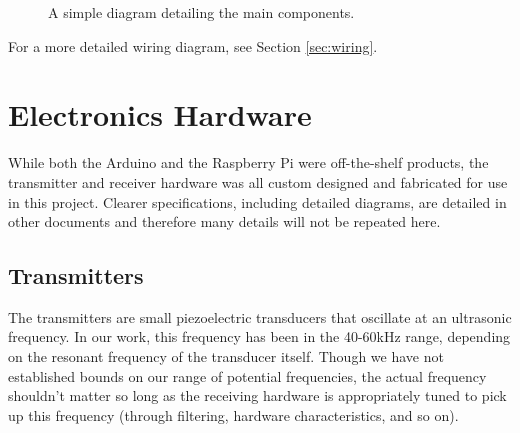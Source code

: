 \documentclass[12pt]{article}
\begin{document}
\begin{figure}[h]
\begin{center}
\end{center}
\caption{A simple diagram detailing the main components.}
\label{fig:component-diagram}
\end{figure}

For a more detailed wiring diagram, see Section \ref{sec:wiring}.

\section{Electronics Hardware}\label{sec:ee-hardware}

While both the Arduino and the Raspberry Pi were off-the-shelf products,
the transmitter and receiver hardware was all custom designed and fabricated
for use in this project.
Clearer specifications, including detailed diagrams, are detailed in other
documents and therefore many details will not be repeated here.

\subsection{Transmitters}

The transmitters are small piezoelectric transducers that oscillate at an
ultrasonic frequency.
In our work, this frequency has been in the 40-60kHz range, depending on the
resonant frequency of the transducer itself.
Though we have not established bounds on our range of potential frequencies,
the actual frequency shouldn't matter so long as the receiving hardware is
appropriately tuned to pick up this frequency (through filtering,
hardware characteristics, and so on).
\end{document}
